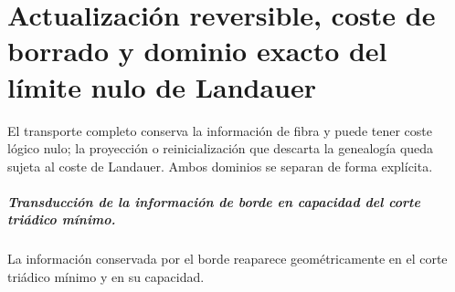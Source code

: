\chapter{Actualización reversible, coste de borrado y dominio exacto del límite nulo de Landauer}
\label{chap:parte-iv-57}

El transporte completo conserva la información de fibra y puede tener coste lógico nulo; la proyección o reinicialización que descarta la genealogía queda sujeta al coste de Landauer. Ambos dominios se separan de forma explícita.



\paragraph{Transducción de la información de borde en capacidad del corte triádico mínimo.} La información conservada por el borde reaparece geométricamente en el corte triádico mínimo y en su capacidad.
